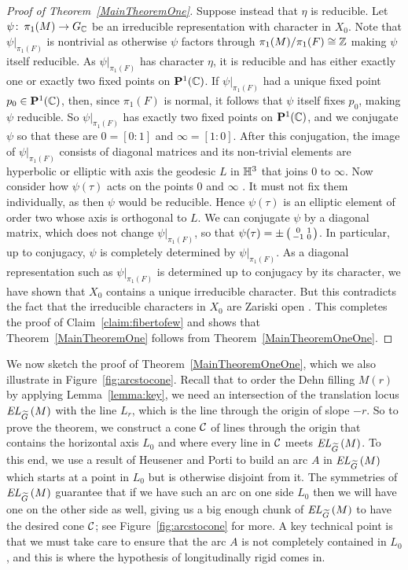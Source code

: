 \documentclass[tikz, sepfignums, defaultenums]{nmd/article}
\newcommand{\GC}{G_\C}
\newcommand{\Pone}{\P^1(\C)}
\newcommand{\TEL}[1]{\mathit{EL}_\Gtil\left(#1\right)}
\newcommand{\psiF}{{\psi|_{\pi_1(F)}}}
\begin{document}
\begin{proof}[Proof of Theorem~\ref{MainTheoremOne}]
Suppose instead that $\eta$ is reducible. Let
$\psi \maps \pi_1(M) \to \GC$ be an irreducible representation with
character in $X_0$.  Note that $\psiF$ is nontrivial as otherwise
$\psi$ factors through $\pi_1(M)/\pi_1(F) \cong {\mathbb Z}$ making $\psi$
itself reducible.  As $\psiF$ has character $\eta$, it is reducible
and has either exactly one or exactly two fixed points on $\Pone$.  If
$\psiF$ had a unique fixed point $p_0 \in \Pone$, then, since
$\pi_1(F)$ is normal, it follows that $\psi$ itself fixes $p_0$,
making $\psi$ reducible.  So $\psiF$ has exactly two fixed points on
$\Pone$, and we conjugate $\psi$ so that these are $0 = [0:1]$ and
$\infty = [1:0]$.  After this conjugation, the image of $\psiF$
consists of diagonal matrices and its non-trivial elements are
hyperbolic or elliptic with axis the geodesic $L$ in ${\mathbb{H}}^3$ that joins
$0$ to $\infty$.  Now consider how $\psi(\tau)$ acts on the points $0$
and $\infty$ . It must not fix them individually, as then $\psi$ would
be reducible. Hence $\psi(\tau)$ is an elliptic element of order two
whose axis is orthogonal to $L$.  We can conjugate $\psi$ by a
diagonal matrix, which does not change $\psiF$, so that
$\psi(\tau) = \pm \left(\begin{smallmatrix} \scriptstyle 0 & \scriptstyle 1 \\ \scriptstyle -1 & \scriptstyle 0 \end{smallmatrix}\right)$.  In particular, up to
conjugacy, $\psi$ is completely determined by $\psiF$.  As a diagonal
representation such as $\psiF$ is determined up to conjugacy by its
character, we have shown that $X_0$ contains a unique irreducible
character.  But this contradicts the fact that the irreducible
characters in $X_0$ are Zariski open
\cite[Corollary~3.6]{HeusenerPorti2004}.  This completes the proof of
Claim~\ref{claim:fibertofew} and shows that
Theorem~\ref{MainTheoremOne} follows from
Theorem~\ref{MainTheoremOneOne}.
\end{proof}

We now sketch the proof of Theorem~\ref{MainTheoremOneOne}, which we
also illustrate in Figure~\ref{fig:arcstocone}.  Recall that to order
the Dehn filling $M(r)$ by applying Lemma~\ref{lemma:key}, we need an
intersection of the translation locus $\TEL{M}$ with the line $L_r$,
which is the line through the origin of slope $-r$.  So to prove the
theorem, we construct a cone ${\mathcal C}$ of lines through the origin that
contains the horizontal axis $L_0$ and where every line in ${\mathcal C}$ meets
$\TEL{M}$.  To this end, we use a result of Heusener and Porti
\cite{HeusenerPorti2005} to build an arc $A$ in $\TEL{M}$ which
starts at a point in $L_0$ but is otherwise disjoint from it.  The
symmetries of $\TEL{M}$ guarantee that if we have such an arc on one
side $L_0$ then we will have one on the other side as well, giving us
a big enough chunk of $\TEL{M}$ to have the desired cone ${\mathcal C}$; see
Figure~\ref{fig:arcstocone} for more.  A key technical point is that
we must take care to ensure that the arc $A$ is not completely
contained in $L_0$, and this is where the hypothesis of longitudinally
rigid comes in.
\end{document}
